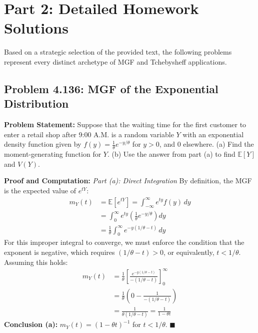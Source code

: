 \documentclass[11pt, a4paper]{article}
\theoremstyle{definition}
\theoremstyle{remark}
\newcommand{\E}{\mathbb{E}}
\begin{document}
\newpage

\section{Part 2: Detailed Homework Solutions}

Based on a strategic selection of the provided text, the following problems represent every distinct archetype of MGF and Tchebysheff applications.

\subsection{Problem 4.136: MGF of the Exponential Distribution}
\textbf{Problem Statement:} Suppose that the waiting time for the first customer to enter a retail shop after 9:00 A.M. is a random variable $Y$ with an exponential density function given by $f(y) = \frac{1}{\theta} e^{-y/\theta}$ for $y > 0$, and $0$ elsewhere.
(a) Find the moment-generating function for $Y$.
(b) Use the answer from part (a) to find $\E[Y]$ and $V(Y)$.

\textbf{Proof and Computation:}
\textit{Part (a): Direct Integration}
By definition, the MGF is the expected value of $e^{tY}$:
\begin{align*}
m_Y(t) &= \E[e^{tY}] = \int_{-\infty}^{\infty} e^{ty} f(y) \, dy \\
&= \int_{0}^{\infty} e^{ty} \left( \frac{1}{\theta} e^{-y/\theta} \right) dy \\
&= \frac{1}{\theta} \int_{0}^{\infty} e^{-y(1/\theta - t)} \, dy
\end{align*}
For this improper integral to converge, we must enforce the condition that the exponent is negative, which requires $(1/\theta - t) > 0$, or equivalently, $t < 1/\theta$. Assuming this holds:
\begin{align*}
m_Y(t) &= \frac{1}{\theta} \left[ \frac{e^{-y(1/\theta - t)}}{-(1/\theta - t)} \right]_{0}^{\infty} \\
&= \frac{1}{\theta} \left( 0 - \frac{1}{-(1/\theta - t)} \right) \\
&= \frac{1}{\theta(1/\theta - t)} = \frac{1}{1 - \theta t}
\end{align*}
\textbf{Conclusion (a):} $m_Y(t) = (1 - \theta t)^{-1}$ for $t < 1/\theta$. $\blacksquare$
\end{document}
